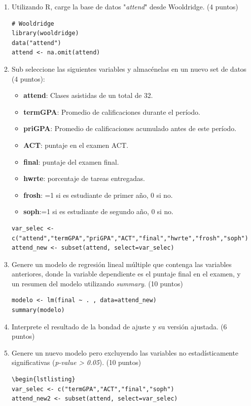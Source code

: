 \documentclass[letterpaper,11pt]{article}
\begin{document}
\begin{enumerate}
    \item Utilizando R, carge la base de datos "\textit{attend}" desde Wooldridge. (4 puntos)

\begin{lstlisting}
# Wooldridge
library(wooldridge)
data("attend")
attend <- na.omit(attend)
\end{lstlisting}

    \item Sub seleccione las siguientes variables y almacénelas en un nuevo set de datos (4 puntos):

\begin{itemize}
\item \textbf{attend}: Clases asistidas de un total de 32.
\item \textbf{termGPA}: Promedio de calificaciones durante el período.
\item \textbf{priGPA}: Promedio de calificaciones acumulado antes de este período.
\item \textbf{ACT}: puntaje en el examen ACT.
\item \textbf{final}: puntaje del examen final.
\item \textbf{hwrte}: porcentaje de tareas entregadas.
\item \textbf{frosh}: =1 si es estudiante de primer año, 0 si no.
\item \textbf{soph}:=1 si es estudiante de segundo año, 0 si no.
\end{itemize}
\begin{lstlisting}
var_selec <- c("attend","termGPA","priGPA","ACT","final","hwrte","frosh","soph")
attend_new <- subset(attend, select=var_selec)
\end{lstlisting}


    \item Genere un modelo de regresión lineal múltiple que contenga las variables anteriores, donde la variable dependiente es el puntaje final en el examen, y un resumen del modelo utilizando \textit{summary}. (10 puntos)
 \begin{lstlisting}
modelo <- lm(final ~ . , data=attend_new)
summary(modelo)
\end{lstlisting}   

    \item Interprete el resultado de la bondad de ajuste y su versión ajustada. (6 puntos)

    \item Genere un nuevo modelo pero excluyendo las variables no estadísticamente significativas (\textit{p-value > 0.05}). (10 puntos)
 \begin{lstlisting}
\begin{lstlisting}
var_selec <- c("termGPA","ACT","final","soph")
attend_new2 <- subset(attend, select=var_selec)
\end{lstlisting}



\end{enumerate}
\end{document}
